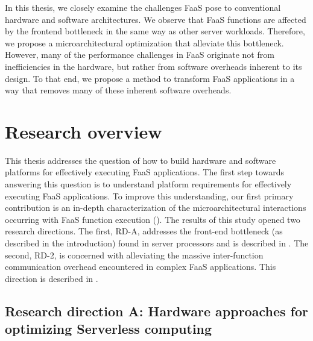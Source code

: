 \documentclass[../main.tex]{subfiles}
\begin{document}
\begin{refsection}
In this thesis, we closely examine the challenges FaaS pose to
conventional hardware and software architectures. We observe that FaaS
functions are affected by the frontend bottleneck in the same way as
other server workloads. Therefore, we propose a microarchitectural
optimization that alleviate this bottleneck. However, many of the
performance challenges in FaaS originate not from inefficiencies in
the hardware, but rather from software overheads inherent to its
design. To that end, we propose a method to transform FaaS
applications in a way that removes many of these inherent software overheads.





\section{Research overview}
This thesis addresses the question of how to build hardware and
software platforms for effectively executing FaaS applications. The
first step towards answering this question is to understand platform
requirements for effectively executing FaaS applications. To improve
this understanding, our first primary contribution is an in-depth
characterization of the microarchitectural interactions occurring with
FaaS function execution (). The results of this study
opened two research directions. The first, RD-A, addresses the
front-end bottleneck (as described in the introduction) found in
server processors and is described in . The second,
RD-2, is concerned with alleviating the massive inter-function
communication overhead encountered in complex FaaS applications. This
direction is described in .

\subsection{Research direction A: Hardware approaches for optimizing Serverless computing}
\label{sec:pc1}


\end{refsection}
\end{document}
